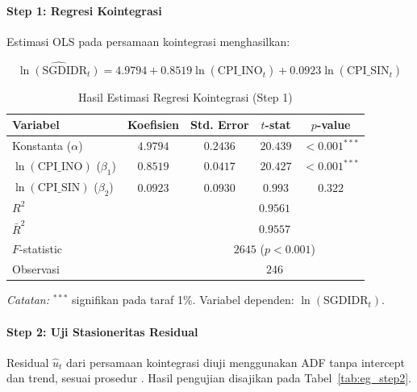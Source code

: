 \documentclass[12pt]{article}
\begin{document}
\paragraph{Step 1: Regresi Kointegrasi}
\noindent
Estimasi OLS pada persamaan kointegrasi menghasilkan:

\begin{equation}
    \widehat{\ln(\text{SGDIDR}_t)} = 4.9794 + 0.8519\ln(\text{CPI\_INO}_t) + 0.0923\ln(\text{CPI\_SIN}_t)
\end{equation}

\begin{table}[H]
    \centering
    \caption{Hasil Estimasi Regresi Kointegrasi (Step 1)}
    \label{tab:eg_step1}
    \begin{tabular}{lcccc}
        \toprule
        Variabel & Koefisien & Std. Error & $t$-stat & $p$-value \\
        \midrule
        Konstanta ($\alpha$)           & $4.9794$ & $0.2436$ & $20.439$ & $<0.001^{***}$ \\
        $\ln(\text{CPI\_INO})$ ($\beta_1$) & $0.8519$  & $0.0417$ & $20.427$ & $<0.001^{***}$ \\
        $\ln(\text{CPI\_SIN})$ ($\beta_2$) & $0.0923$  & $0.0930$ & $0.993$  & $0.322$ \\
        \midrule
        \multicolumn{2}{l}{$R^2$}                   & \multicolumn{3}{c}{$0.9561$} \\
        \multicolumn{2}{l}{$\bar{R}^2$}              & \multicolumn{3}{c}{$0.9557$} \\
        \multicolumn{2}{l}{$F$-statistic}            & \multicolumn{3}{c}{$2645$ ($p < 0.001$)} \\
        \multicolumn{2}{l}{Observasi}                & \multicolumn{3}{c}{$246$} \\
        \bottomrule
    \end{tabular}
    \begin{tablenotes}
        \small
        \item \textit{Catatan:} $^{***}$ signifikan pada taraf 1\%. Variabel dependen: 
        $\ln(\text{SGDIDR}_t)$.
    \end{tablenotes}
\end{table}

\paragraph{Step 2: Uji Stasioneritas Residual}
\noindent
Residual $\hat{u}_t$ dari persamaan kointegrasi diuji menggunakan ADF tanpa intercept 
dan trend, sesuai prosedur \citet{Engle1987}. Hasil pengujian disajikan pada 
Tabel~\ref{tab:eg_step2}.
\end{document}
